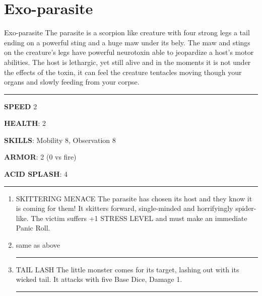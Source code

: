 \section{Exo-parasite}

\begin{rpg-commentbox}{Exo-parasite}
    The parasite is a scorpion like creature with four strong legs a tail ending on a powerful sting and a huge maw under its bely. The maw and stings on the creature's legs have powerful neurotoxin able to jeopardize a host's motor abilities. The host is lethargic, yet still alive and in the moments it is not under the effects of the toxin, it can feel the creature tentacles moving though your organs and slowly feeding from your corpse. 
\end{rpg-commentbox}    


\begin{rpg-commentbox}{}


    \par\noindent\rule{\textwidth}{0.4pt}

    \textbf{SPEED} 2

    \textbf{HEALTH}: 2

    \textbf{SKILLS}: Mobility 8, Observation 8
    
    \textbf{ARMOR}: 2 (0 vs fire)
    
    \textbf{ACID SPLASH}: 4

    \par\noindent\rule{\textwidth}{0.4pt}

    \begin{small}
    \begin{enumerate}
        \item SKITTERING MENACE The parasite has chosen its host and they know it is coming for
        them! It skitters forward, single-minded and horrifyingly spider-like. The victim suffers +1
        STRESS LEVEL and must make an immediate Panic Roll.
        \item same as above
        
        \par\noindent\rule{.9\textwidth}{0.4pt}

        \item TAIL LASH The little monster comes for its target, lashing out with its wicked tail. It attacks
        with five Base Dice, Damage 1.

        \par\noindent\rule{.9\textwidth}{0.4pt}


\end{enumerate}
\end{small}
\end{rpg-commentbox}
